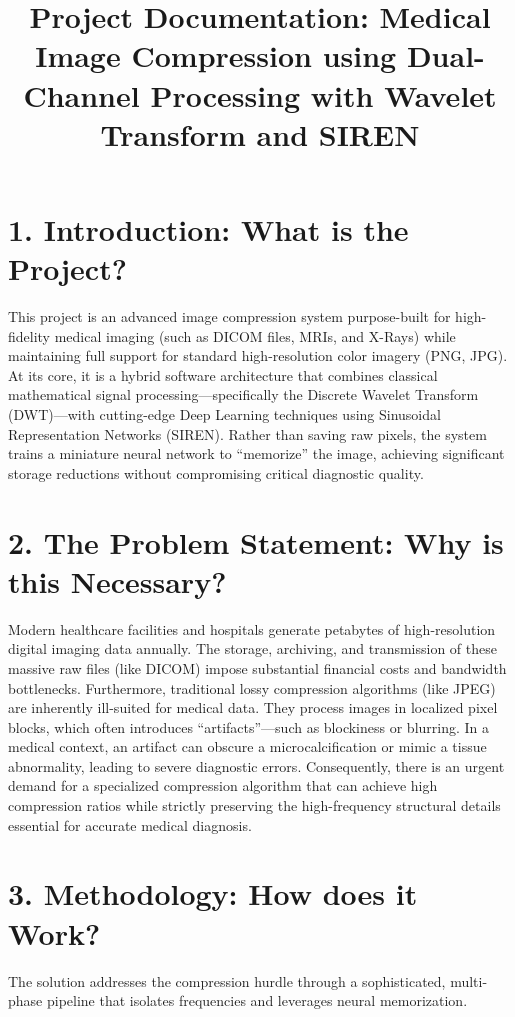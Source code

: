 \documentclass[12pt,a4paper]{article}
\title{\textbf{Project Documentation: Medical Image Compression using Dual-Channel Processing with Wavelet Transform and SIREN}}
\author{}
\date{}
\begin{document}
\maketitle


\section*{1. Introduction: What is the Project?}
This project is an advanced image compression system purpose-built for high-fidelity medical imaging (such as DICOM files, MRIs, and X-Rays) while maintaining full support for standard high-resolution color imagery (PNG, JPG). At its core, it is a hybrid software architecture that combines classical mathematical signal processing—specifically the Discrete Wavelet Transform (DWT)—with cutting-edge Deep Learning techniques using Sinusoidal Representation Networks (SIREN). Rather than saving raw pixels, the system trains a miniature neural network to ``memorize'' the image, achieving significant storage reductions without compromising critical diagnostic quality.

\section*{2. The Problem Statement: Why is this Necessary?}
Modern healthcare facilities and hospitals generate petabytes of high-resolution digital imaging data annually. The storage, archiving, and transmission of these massive raw files (like DICOM) impose substantial financial costs and bandwidth bottlenecks. Furthermore, traditional lossy compression algorithms (like JPEG) are inherently ill-suited for medical data. They process images in localized pixel blocks, which often introduces ``artifacts''—such as blockiness or blurring. In a medical context, an artifact can obscure a microcalcification or mimic a tissue abnormality, leading to severe diagnostic errors. Consequently, there is an urgent demand for a specialized compression algorithm that can achieve high compression ratios while strictly preserving the high-frequency structural details essential for accurate medical diagnosis.

\section*{3. Methodology: How does it Work?}
The solution addresses the compression hurdle through a sophisticated, multi-phase pipeline that isolates frequencies and leverages neural memorization.
\end{document}
